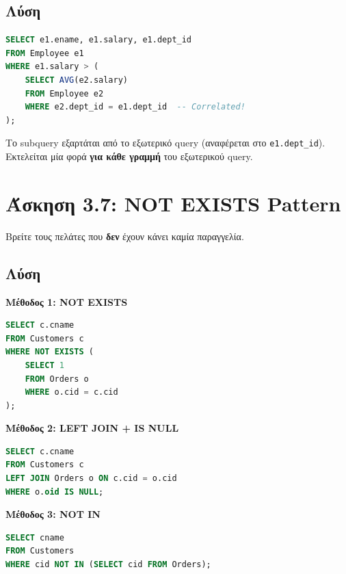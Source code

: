\subsection*{Λύση}

\begin{lstlisting}[language=SQL]
SELECT e1.ename, e1.salary, e1.dept_id
FROM Employee e1
WHERE e1.salary > (
    SELECT AVG(e2.salary)
    FROM Employee e2
    WHERE e2.dept_id = e1.dept_id  -- Correlated!
);
\end{lstlisting}

\begin{infobox}
Το subquery εξαρτάται από το εξωτερικό query (αναφέρεται στο \texttt{e1.dept\_id}).
Εκτελείται μία φορά \textbf{για κάθε γραμμή} του εξωτερικού query.
\end{infobox}

\section{Άσκηση 3.7: NOT EXISTS Pattern}

\begin{formulabox}[Εκφώνηση]
Βρείτε τους πελάτες που \textbf{δεν} έχουν κάνει καμία παραγγελία.
\end{formulabox}

\subsection*{Λύση}

\textbf{Μέθοδος 1: NOT EXISTS}

\begin{lstlisting}[language=SQL]
SELECT c.cname
FROM Customers c
WHERE NOT EXISTS (
    SELECT 1
    FROM Orders o
    WHERE o.cid = c.cid
);
\end{lstlisting}

\textbf{Μέθοδος 2: LEFT JOIN + IS NULL}

\begin{lstlisting}[language=SQL]
SELECT c.cname
FROM Customers c
LEFT JOIN Orders o ON c.cid = o.cid
WHERE o.oid IS NULL;
\end{lstlisting}

\textbf{Μέθοδος 3: NOT IN}

\begin{lstlisting}[language=SQL]
SELECT cname
FROM Customers
WHERE cid NOT IN (SELECT cid FROM Orders);
\end{lstlisting}

